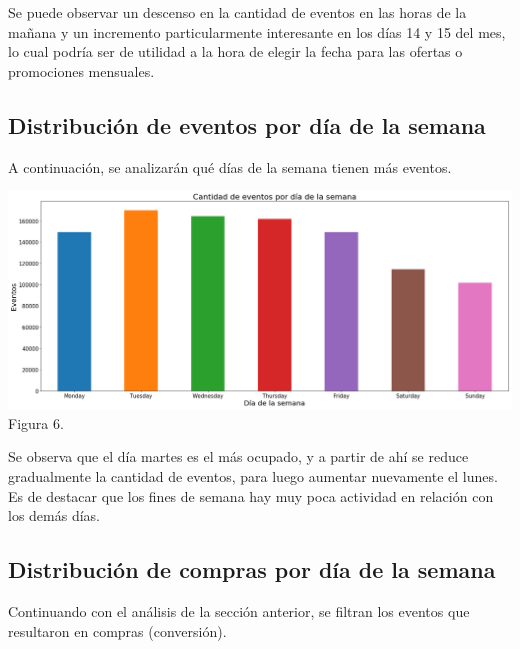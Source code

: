 \documentclass[a4paper ,12pt]{article}
\begin{document}
Se puede observar un descenso en la cantidad de eventos en las horas de la mañana y un incremento particularmente interesante en los días 14 y 15 del mes, lo cual podría ser de utilidad a la hora de elegir la fecha para las ofertas o promociones mensuales.

\subsection{Distribución de eventos por día de la semana}

A continuación, se analizarán qué días de la semana tienen más eventos.

\begin{center}
	\includegraphics[width=1.1\linewidth]{output_27_1}
	Figura 6.
	
\end{center}

Se observa que el día martes es el más ocupado, y a partir de ahí se reduce gradualmente la cantidad de eventos, para luego aumentar nuevamente el lunes. \\

Es de destacar que los fines de semana hay muy poca actividad en relación con los demás días.\\

\begin{center}
	

\end{center}
\newpage

\subsection{Distribución de compras por día de la semana}
Continuando con el análisis de la sección anterior, se filtran los eventos que resultaron en compras (conversión).
\end{document}
